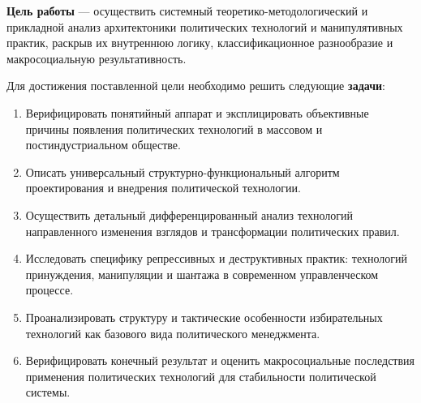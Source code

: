\textbf{Цель работы} — осуществить системный теоретико-методологический и прикладной анализ архитектоники политических технологий и манипулятивных практик, раскрыв их внутреннюю логику, классификационное разнообразие и макросоциальную результативность.

Для достижения поставленной цели необходимо решить следующие \textbf{задачи}:
\begin{enumerate}
    \item Верифицировать понятийный аппарат и эксплицировать объективные причины появления политических технологий в массовом и постиндустриальном обществе.
    \item Описать универсальный структурно-функциональный алгоритм проектирования и внедрения политической технологии.
    \item Осуществить детальный дифференцированный анализ технологий направленного изменения взглядов и трансформации политических правил.
    \item Исследовать специфику репрессивных и деструктивных практик: технологий принуждения, манипуляции и шантажа в современном управленческом процессе.
    \item Проанализировать структуру и тактические особенности избирательных технологий как базового вида политического менеджмента.
    \item Верифицировать конечный результат и оценить макросоциальные последствия применения политических технологий для стабильности политической системы.
\end{enumerate}
